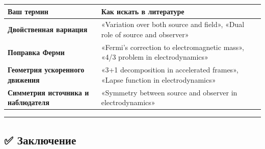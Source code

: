 \documentclass[11pt]{article}
\begin{document}
\begin{longtable}[]{@{}ll@{}}
\toprule
\begin{minipage}[b]{0.16\columnwidth}\raggedright\strut
Ваш термин\strut
\end{minipage} & \begin{minipage}[b]{0.33\columnwidth}\raggedright\strut
Как искать в литературе\strut
\end{minipage}\tabularnewline
\midrule
\endhead
\begin{minipage}[t]{0.16\columnwidth}\raggedright\strut
\textbf{Двойственная вариация}\strut
\end{minipage} & \begin{minipage}[t]{0.33\columnwidth}\raggedright\strut
«Variation over both source and field», «Dual role of source and
observer»\strut
\end{minipage}\tabularnewline
\begin{minipage}[t]{0.16\columnwidth}\raggedright\strut
\textbf{Поправка Ферми}\strut
\end{minipage} & \begin{minipage}[t]{0.33\columnwidth}\raggedright\strut
«Fermi's correction to electromagnetic mass», «4/3 problem in
electrodynamics»\strut
\end{minipage}\tabularnewline
\begin{minipage}[t]{0.16\columnwidth}\raggedright\strut
\textbf{Геометрия ускоренного движения}\strut
\end{minipage} & \begin{minipage}[t]{0.33\columnwidth}\raggedright\strut
«3+1 decomposition in accelerated frames», «Lapse function in
electrodynamics»\strut
\end{minipage}\tabularnewline
\begin{minipage}[t]{0.16\columnwidth}\raggedright\strut
\textbf{Симметрия источника и наблюдателя}\strut
\end{minipage} & \begin{minipage}[t]{0.33\columnwidth}\raggedright\strut
«Symmetry between source and observer in electrodynamics»\strut
\end{minipage}\tabularnewline
\bottomrule
\end{longtable}

\begin{center}\rule{0.5\linewidth}{\linethickness}\end{center}

\subsection{✅
Заключение}\label{ux437ux430ux43aux43bux44eux447ux435ux43dux438ux435-1}
\end{document}
